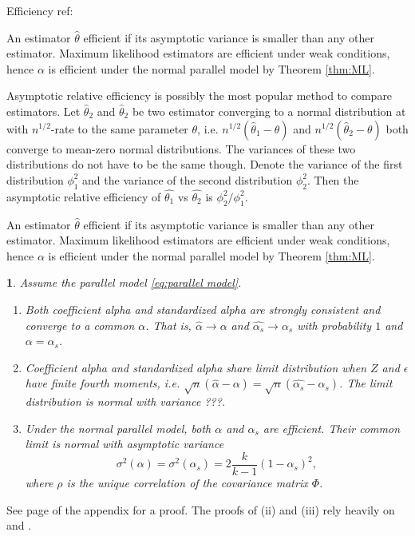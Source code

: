 \documentclass{article}
\makeatletter
\theoremstyle{plain}
\newtheorem{thm}{\protect\theoremname}
\theoremstyle{plain}
\theoremstyle{definition}
\theoremstyle{remark}
\theoremstyle{definition}
\theoremstyle{plain}
\theoremstyle{plain}
\theoremstyle{definition}
\newenvironment{proof}[1][\protect\proofname]{\par
	\normalfont\topsep6\p@\@plus6\p@\relax
	\trivlist
	\itemindent\parindent
	\item[\hskip\labelsep\scshape #1]\ignorespaces
}{%
	\endtrivlist\@endpefalse
}
\providecommand{\proofname}{Proof}
\providecommand{\theoremname}{Theorem}
\makeatother
\begin{document}
Efficiency ref: \citep[][Section 4.3]{Lehmann2004-ke}

An estimator $\widehat{\theta}$ efficient if its asymptotic variance is smaller than any other estimator. Maximum likelihood estimators are efficient under weak conditions, hence $\alpha$ is efficient under the normal parallel model by Theorem \ref{thm:ML}.

Asymptotic relative efficiency is possibly the most popular method to compare estimators. Let $\widehat{\theta}_2$ and $\widehat{\theta}_2$ be two estimator converging to a normal distribution at with $n^{1/2}$-rate to the same parameter $\theta$, i.e. 
$n^{1/2}{(\widehat{\theta}_1 - \theta)}$ and $n^{1/2}{(\widehat{\theta}_2 - \theta)}$ both converge to mean-zero normal distributions. The variances of these two distributions do not have to be the same though. Denote the variance of the first distribution $\phi_1^2$ and the variance of the second distribution $\phi_2^2$. Then the asymptotic relative efficiency of $\widehat{\theta_1}$ vs $\widehat{\theta_2}$ is $\phi_2^2/\phi_1^2$.

An estimator $\widehat{\theta}$ efficient if its asymptotic variance is smaller than any other estimator. Maximum likelihood estimators are efficient under weak conditions, hence $\alpha$ is efficient under the normal parallel model by Theorem \ref{thm:ML}.

\begin{thm}
\label{thm:asymptotics}
Assume the parallel model \eqref{eq:parallel model}.
\begin{enumerate}[label=(\roman*)]
    \item Both coefficient alpha and standardized alpha are strongly consistent and converge to a common $\alpha$. That is, $\widehat{\alpha}\to\alpha$ and $\widehat{\alpha_s}\to\alpha_s$ with probability $1$ and $\alpha = \alpha_s$.
    \item Coefficient alpha and standardized alpha share limit distribution when $Z$ and $\epsilon$ have finite fourth moments, i.e. $\sqrt{n}(\widehat{\alpha} - \alpha) = \sqrt{n}(\widehat{\alpha_s} - \alpha_s)$. The limit distribution is normal with variance ???.
    \item Under the normal parallel model, both $\alpha$ and $\alpha_s$ are efficient. Their common limit is normal with asymptotic variance 
    $$\sigma^{2}\left(\alpha\right)= \sigma^{2}\left(\alpha_{s}\right)=2\frac{k}{k-1}\left(1-\alpha_{s}\right)^{2},$$
    where $\rho$ is the unique correlation of the covariance matrix $\Phi$.
\end{enumerate}
\end{thm}    
\begin{proof}
See page \pageref{proof:asymptotics} of the appendix for a proof. The proofs of (ii) and (iii) rely heavily on \citep{Van_Zyl2000-si} and \citep{hayashi2005note}.
\end{proof}
\end{document}
